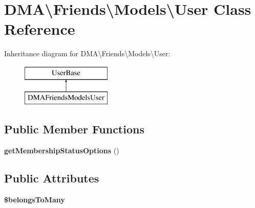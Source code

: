 \hypertarget{classDMA_1_1Friends_1_1Models_1_1User}{\section{D\-M\-A\textbackslash{}Friends\textbackslash{}Models\textbackslash{}User Class Reference}
\label{classDMA_1_1Friends_1_1Models_1_1User}
}
Inheritance diagram for D\-M\-A\textbackslash{}Friends\textbackslash{}Models\textbackslash{}User\-:\begin{figure}[H]
\begin{center}
\leavevmode
\includegraphics[height=2.000000cm]{da/dbf/classDMA_1_1Friends_1_1Models_1_1User}
\end{center}
\end{figure}
\subsection*{Public Member Functions}
\begin{DoxyCompactItemize}
\item 
\hypertarget{classDMA_1_1Friends_1_1Models_1_1User_a4d122bc16511e65e703d5d2dfb75808b}{{\bfseries get\-Membership\-Status\-Options} ()}\label{classDMA_1_1Friends_1_1Models_1_1User_a4d122bc16511e65e703d5d2dfb75808b}

\end{DoxyCompactItemize}
\subsection*{Public Attributes}
\begin{DoxyCompactItemize}
\item 
{\bfseries \$belongs\-To\-Many}
\end{DoxyCompactItemize}


